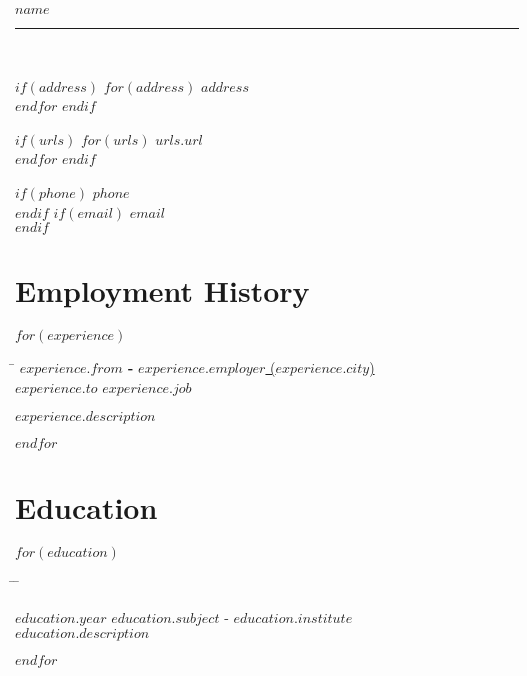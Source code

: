 \documentclass[$fontsize$]{article} %
\newlength{\smallertextwidth}
\renewcommand{\title}[1]{
{\huge{ \color{slateblue}\textbf{#1} }}\\ %
\rule{\textwidth}{0.3mm}\\ %
}
\newcommand{\job}[6]{
\begin{tabbing}
\hspace{2cm} \= \kill
{\color{slateblue}\bfseries{#1}} \> \color{slateblue}\href{#4}{#3} \\
{\color{slateblue}\bfseries{#2}} \>\+ \itshape{#5} \\
\begin{minipage}{\smallertextwidth}
\vspace{1mm}
#6
\end{minipage}
\end{tabbing}
\vspace{1mm}
}
\newcommand{\tabbedblock}[1]{
\begin{tabbing}
\hspace{2cm} \= \hspace{4cm} \= \kill
#1
\end{tabbing}
}
\begin{document}

\title{$name$} %

\vspace{-5mm}

\begin{multicols}{2}

$if(address)$
$for(address)$
$address$\\
$endfor$
$endif$

$if(urls)$
$for(urls)$
\href{$urls.url$}{$urls.url$}\\
$endfor$
$endif$

\columnbreak

$if(phone)$
$phone$\\
$endif$
$if(email)$
\href{mailto:$email$}{$email$}\\
$endif$
\end{multicols}


\vspace{-5mm}


\section{Employment History}
$for(experience)$
\job
{$experience.from$ -}{$experience.to$}
{$experience.employer$ ($experience.city$)}
{$experience.url$}
{$experience.job$}
{$experience.description$}
$endfor$


\section{Education}
$for(education)$
\tabbedblock{
    {\color{slateblue}\bf{$education.year$}} \> $education.subject$ - \href{http://$education.url$}{$education.institute$} \\
\>\textit{$education.description$}
}
$endfor$
\end{document}
